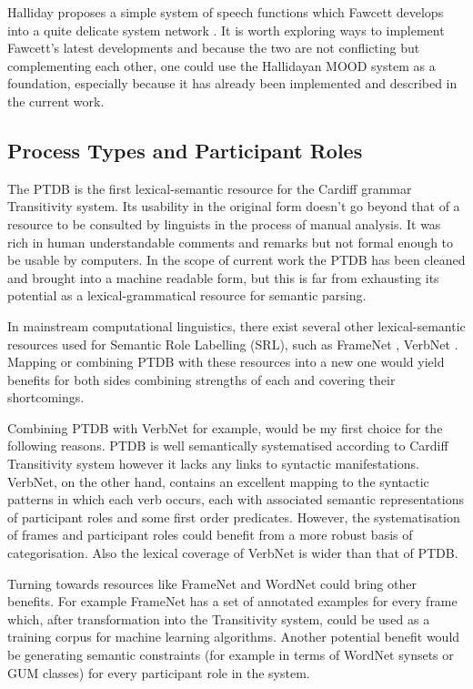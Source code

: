    Halliday proposes a simple system of speech functions \citep[p.136]{Halliday2013} which Fawcett develops into a quite delicate system network \citep{Fawcett2011}. It is worth exploring ways to implement Fawcett's latest developments and because the two are not conflicting but complementing each other, one could use the Hallidayan MOOD system as a foundation, especially because it has already been implemented and described in the current work. 

\subsection{Process Types and Participant Roles}
    The PTDB \citep{Neale2002} is the first lexical-semantic resource for the Cardiff grammar Transitivity system. Its usability in the original form doesn't go beyond that of a resource to be consulted by linguists in the process of manual analysis. It was rich in human understandable comments and remarks but not formal enough to be usable by computers. In the scope of current work the PTDB has been cleaned and brought into a machine readable form, but this is far from exhausting its potential as a lexical-grammatical resource for semantic parsing. 

    In mainstream computational linguistics, there exist several other lexical-semantic resources used for Semantic Role Labelling (SRL), such as FrameNet \citep{Baker1998}, VerbNet \citep{Kipper2008}. Mapping or combining PTDB with these resources into a new one would yield benefits for both sides combining strengths of each and covering their shortcomings.

    Combining PTDB with VerbNet for example, would be my first choice for the following reasons. PTDB is well semantically systematised according to Cardiff Transitivity system however it lacks any links to syntactic manifestations. VerbNet, on the other hand, contains an excellent mapping to the syntactic patterns in which each verb occurs, each with associated semantic representations of participant roles and some first order predicates. However, the systematisation of frames and participant roles could benefit from a more robust basis of categorisation. Also the lexical coverage of VerbNet is wider than that of PTDB. 

    Turning towards resources like FrameNet and WordNet could bring other benefits. For example FrameNet has a set of annotated examples for every frame which, after transformation into the Transitivity system, could be used as a training corpus for machine learning algorithms. Another potential benefit would be generating semantic constraints (for example in terms of WordNet \citep{Miller1995} synsets or GUM \citep{Bateman1995,Bateman2010} classes) for every participant role in the system.

